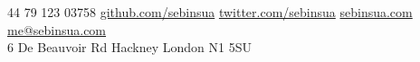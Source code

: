 \documentclass[10pt,a4paper]{article}
\begin{document}
\sloppy  %


\nobreakvspace{0.3em}  %

\noindent\textsmaller{+}44 79 123 03758\sbull
\href{http://github.com/sebinsua}{github.com/sebinsua}\sbull
\href{http://twitter.com/sebinsua}{twitter.com/sebinsua}\sbull
\href{http://sebinsua.com}{sebinsua.com}\sbull
\href{mailto:me@sebinsua.com}{me\mbox{}@\mbox{}sebinsua.com}
\\
6 De Beauvoir Rd\sbull
Hackney\sbull
London\sbull
N1 5SU

\spacedhrule{0.9em}{-0.4em}  %

\end{document}
